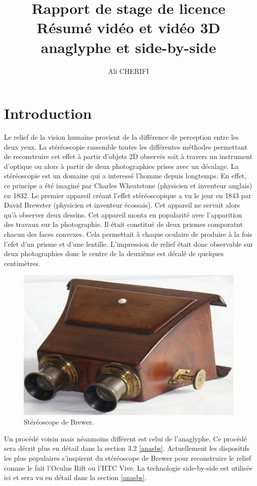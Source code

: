 \documentclass[10pt,a4paper]{article}
\author{Ali CHERIFI}
\title{Rapport de stage de licence\\Résumé vidéo et vidéo 3D anaglyphe et side-by-side}
\begin{document}
\maketitle
\newpage
\tableofcontents
\newpage
\section{Introduction}
Le relief de la vision humaine provient de la différence de perception entre les deux yeux. La stéréoscopie rassemble toutes les différentes méthodes permettant de reconstruire cet effet à partir d'objets 2D
observés soit à travers un instrument d'optique ou alors à partir de deux photographies prises avec un décalage.
La stéréoscopie est un domaine qui a interessé l'homme depuis longtemps. En effet, ce principe a été imaginé par Charles Wheatstone (physicien et inventeur anglais) en 1832.
Le premier appareil créant l'effet stéréoscopique a vu le jour en 1843 par David Brewster (physicien et inventeur écossais). Cet appareil ne servait alors qu'à observer deux dessins.
Cet appareil monta en popularité avec l'apparition des travaux sur la photographie. Il était constitué de deux prismes comporatnt chacun des faces convexes. Cela permettait à chaque oculaire de
produire à la fois l'efet d'un prisme et d'une lentille. L'impression de relief était donc observable sur deux photographies donc le centre de la deuxième est décalé de quelques centimètres.

\begin{figure}[!h]
\center
\includegraphics[scale = 0.5]{brewer.jpg}
\caption{Stéréoscope de Brewer.}
\end{figure}

Un procédé voisin mais néanmoins différent est celui de l'anaglyphe. Ce procédé sera décrit plus en détail dans la section 3.2 \ref{anasbs}.
Actuellement les dispositifs les plus populaires s'inspirent du stéréoscope de Brewer pour reconstruire le relief comme le fait l'Oculus Rift ou l'HTC Vive. La technologie side-by-side est utilisée ici et
sera vu en détail dans la section \ref{anasbs}.
\end{document}

